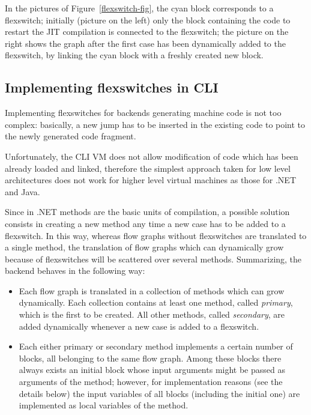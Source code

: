 In the pictures of Figure~\ref{flexswitch-fig}, the cyan block
corresponds to a flexswitch; initially (picture on the left) 
only the block containing the code to restart the JIT compilation
is connected to the flexswitch; the picture on the right
shows the graph after the first case has been dynamically added to the flexswitch,
by linking the cyan block with a freshly created new block.


\subsection{Implementing flexswitches in CLI}

Implementing flexswitches for backends generating machine code is
not too complex: basically, a new jump has to be inserted in the
existing code to point to the newly generated code fragment.

Unfortunately, the CLI VM does not allow modification of code which
has been already loaded and linked, therefore the simplest approach
taken for low level architectures does not work for higher level 
virtual machines as those for .NET and Java.

Since in .NET methods are the basic units of compilation, a possible
solution consists in creating a new method 
any time a new case has to be added to a flexswitch.
In this way, whereas flow graphs without flexswitches are translated
to a single method, the translation of flow graphs which can dynamically grow because of
flexswitches will be scattered over several methods.
Summarizing, the backend behaves in the following way:
\begin{itemize}
\item Each flow graph is translated in a collection of methods which
  can grow dynamically. Each collection contains at least one
  method, called \emph{primary}, which is the first to be created.
  All other methods, called \emph{secondary}, are added dynamically 
  whenever a new case is added to a flexswitch.

\item Each either primary or secondary method implements a certain
  number of blocks, all belonging to the same flow graph. Among these blocks
  there always exists an initial block whose input arguments 
  might be passed as arguments of the method; however, for
  implementation  reasons (see the details below) the input variables
  of all blocks (including the initial one)
  are implemented as local variables of the method. 
\end{itemize} 

